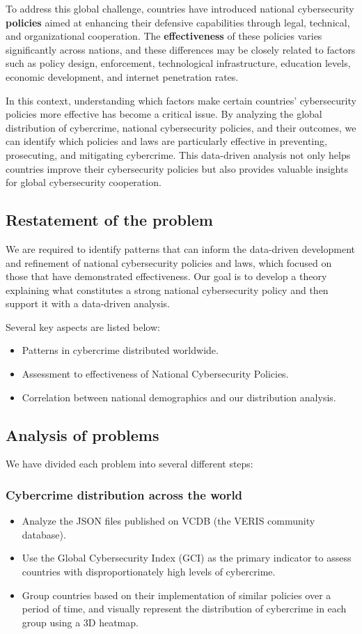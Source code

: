 \documentclass[12pt]{article}
\begin{document}
		To address this global challenge, countries have introduced national cybersecurity \textbf{policies}
		aimed at enhancing their defensive capabilities through legal, technical, and organizational cooperation.
		The \textbf{effectiveness} of these policies varies significantly across nations, and these differences may be closely related to factors
		such as policy design, enforcement, technological infrastructure, education levels, economic development, and internet penetration rates.

		In this context, understanding which factors make certain countries' cybersecurity policies more effective has become a critical issue.
		By analyzing the global distribution of cybercrime, national cybersecurity policies, and their outcomes,
		we can identify which policies and laws are particularly effective in preventing, prosecuting, and mitigating cybercrime.
		This data-driven analysis not only helps countries improve their cybersecurity policies
		but also provides valuable insights for global cybersecurity cooperation.
	\subsection{Restatement of the problem}\label{subsec:restatement-of-the-problem} %
		We are required to identify patterns that can inform the data-driven development and refinement of national cybersecurity policies and laws,
		which focused on those that have demonstrated effectiveness.
		Our goal is to develop a theory explaining what constitutes a strong national cybersecurity policy and then support it with a data-driven analysis.

		Several key aspects are listed below:
		\begin{itemize}
			\item Patterns in cybercrime distributed worldwide.
			\item Assessment to effectiveness of National Cybersecurity Policies.
			\item Correlation between national demographics and our distribution analysis.
		\end{itemize}
	\subsection{Analysis of problems}\label{subsec:analysis-of-problems} %
		We have divided each problem into several different steps:
		\subsubsection[]{Cybercrime distribution across the world} %
			\begin{itemize}
				\item Analyze the JSON files published on VCDB (the VERIS community database).
				\item Use the Global Cybersecurity Index (GCI) as the primary indicator to assess countries with disproportionately high levels of cybercrime.
				\item Group countries based on their implementation of similar policies over a period of time, and
					visually represent the distribution of cybercrime in each group using a 3D heatmap.
			\end{itemize}
\end{document}
